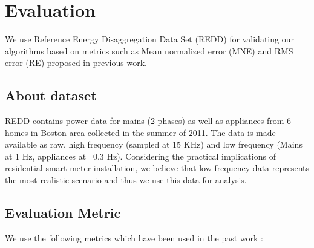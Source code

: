 \documentclass[conference]{IEEEtran}
\newcommand{\figref}[1]{Figure~\ref{#1}}
\begin{document}
\section{Evaluation}

\noindent We use Reference Energy Disaggregation Data Set (REDD) \cite{redd} for validating our algorithms based on metrics such as Mean normalized error (MNE) and RMS error (RE) proposed in previous work.
\subsection{About dataset}
\noindent REDD contains power data for mains (2 phases) as well as appliances from 6 homes in Boston area collected in the summer of 2011. The data is made available as raw, high frequency (sampled at 15 KHz) and low frequency (Mains at 1 Hz, appliances at ~0.3 Hz). Considering the practical implications of residential smart meter installation, we believe that low frequency data represents the most realistic scenario and thus we use this data for analysis. 



%	
%
\subsection{Evaluation Metric}

We use the following metrics which have been used in the past work \cite{parson2012_aaai,redd}:
\end{document}

